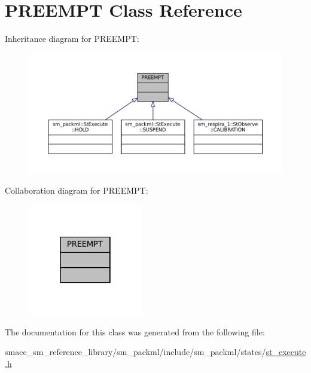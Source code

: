 \hypertarget{classPREEMPT}{}\section{P\+R\+E\+E\+M\+PT Class Reference}
\label{classPREEMPT}


Inheritance diagram for P\+R\+E\+E\+M\+PT\+:
\nopagebreak
\begin{figure}[H]
\begin{center}
\leavevmode
\includegraphics[width=350pt]{classPREEMPT__inherit__graph}
\end{center}
\end{figure}


Collaboration diagram for P\+R\+E\+E\+M\+PT\+:
\nopagebreak
\begin{figure}[H]
\begin{center}
\leavevmode
\includegraphics[width=142pt]{classPREEMPT__coll__graph}
\end{center}
\end{figure}


The documentation for this class was generated from the following file\+:\begin{DoxyCompactItemize}
\item 
smacc\+\_\+sm\+\_\+reference\+\_\+library/sm\+\_\+packml/include/sm\+\_\+packml/states/\hyperlink{st__execute_8h}{st\+\_\+execute.\+h}\end{DoxyCompactItemize}
